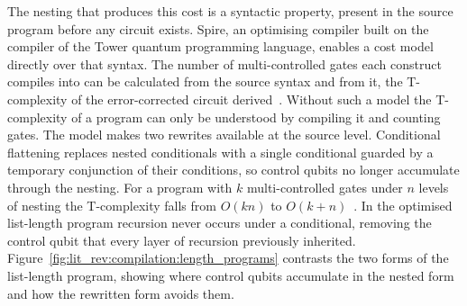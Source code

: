 The nesting that produces this cost is a syntactic property, present in the source program before any circuit exists.
Spire, an optimising compiler built on the compiler of the Tower quantum programming language, enables a cost model directly over that syntax.
The number of multi-controlled gates each construct compiles into can be calculated from the source syntax and from it, the T-complexity of the error-corrected circuit derived~\cite{yuan2025foundationalabstractions}.
Without such a model the T-complexity of a program can only be understood by compiling it and counting gates.
The model makes two rewrites available at the source level.
Conditional flattening replaces nested conditionals with a single conditional guarded by a temporary conjunction of their conditions, so control qubits no longer accumulate through the nesting.
For a program with $k$ multi-controlled gates under $n$ levels of nesting the T-complexity falls from $O(kn)$ to $O(k + n)$~\cite{yuan2025foundationalabstractions}.
In the optimised list-length program recursion never occurs under a conditional, removing the control qubit that every layer of recursion previously inherited.
Figure~\ref{fig:lit_rev:compilation:length_programs} contrasts the two forms of the list-length program, showing where control qubits accumulate in the nested form and how the rewritten form avoids them.
